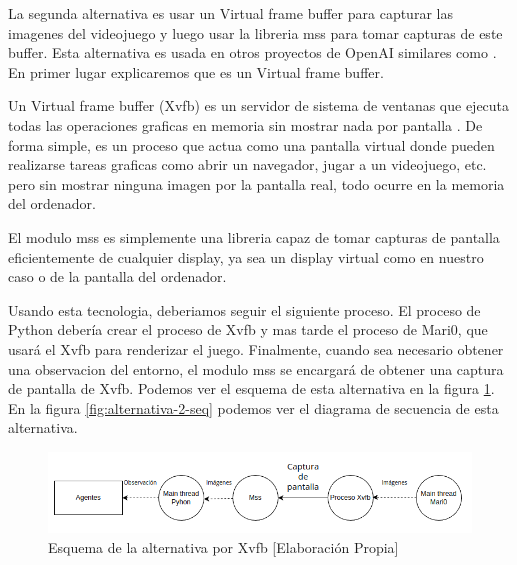 La segunda alternativa es usar un Virtual frame buffer para capturar las imagenes del videojuego y luego usar la libreria mss \cite {mss} para tomar capturas de este buffer. Esta alternativa es usada en otros proyectos de OpenAI similares como \cite {muphen}. En primer lugar explicaremos que es un Virtual frame buffer.

Un Virtual frame buffer (Xvfb) es un servidor de sistema de ventanas que ejecuta todas las operaciones graficas en memoria sin mostrar nada por pantalla \cite {xvfb-wikipedia}. De forma simple, es un proceso que actua como una pantalla virtual donde pueden realizarse tareas graficas como abrir un navegador, jugar a un videojuego, etc. pero sin mostrar ninguna imagen por la pantalla real, todo ocurre en la memoria del ordenador.

El modulo mss es simplemente una libreria capaz de tomar capturas de pantalla eficientemente de cualquier display, ya sea un display virtual como en nuestro caso o de la pantalla del ordenador.

Usando esta tecnologia, deberiamos seguir el siguiente proceso. El proceso de Python debería crear el proceso de Xvfb y mas tarde el proceso de Mari0, que usará el Xvfb para renderizar el juego. Finalmente, cuando sea necesario obtener una observacion del entorno, el modulo mss se encargará de obtener una captura de pantalla de Xvfb. Podemos ver el esquema de esta alternativa en la figura \ref{fig:alternativa-2-com}. En la figura \ref {fig:alternativa-2-seq} podemos ver el diagrama de secuencia de esta alternativa.

\begin{figure}[ht]
    \centering
    \includegraphics[width=1.0\textwidth]{img/Obsertavions-2.png}
    \caption{Esquema de la alternativa por Xvfb [Elaboración Propia]}
    \label{fig:alternativa-2-com}
\end{figure}

